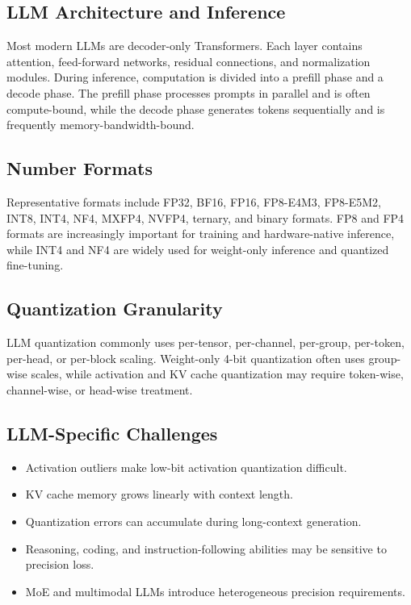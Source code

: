 \documentclass[journal,10pt]{IEEEtran}
\begin{document}
\subsection{LLM Architecture and Inference}
Most modern LLMs are decoder-only Transformers. Each layer contains attention, feed-forward networks, residual connections, and normalization modules. During inference, computation is divided into a prefill phase and a decode phase. The prefill phase processes prompts in parallel and is often compute-bound, while the decode phase generates tokens sequentially and is frequently memory-bandwidth-bound.

\subsection{Number Formats}
Representative formats include FP32, BF16, FP16, FP8-E4M3, FP8-E5M2, INT8, INT4, NF4, MXFP4, NVFP4, ternary, and binary formats. FP8 and FP4 formats are increasingly important for training and hardware-native inference, while INT4 and NF4 are widely used for weight-only inference and quantized fine-tuning.

\subsection{Quantization Granularity}
LLM quantization commonly uses per-tensor, per-channel, per-group, per-token, per-head, or per-block scaling. Weight-only 4-bit quantization often uses group-wise scales, while activation and KV cache quantization may require token-wise, channel-wise, or head-wise treatment.

\subsection{LLM-Specific Challenges}
\begin{itemize}[leftmargin=*,nosep]
  \item Activation outliers make low-bit activation quantization difficult.
  \item KV cache memory grows linearly with context length.
  \item Quantization errors can accumulate during long-context generation.
  \item Reasoning, coding, and instruction-following abilities may be sensitive to precision loss.
  \item MoE and multimodal LLMs introduce heterogeneous precision requirements.
\end{itemize}
\end{document}
